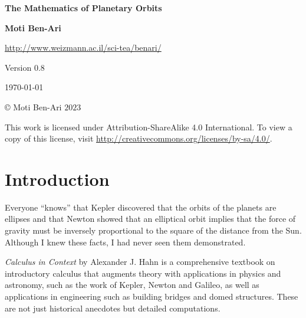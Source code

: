 

\thispagestyle{empty}

\begin{center}
\textbf{\LARGE The Mathematics of Planetary Orbits}

\bigskip
\bigskip
\bigskip

\textbf{\Large Moti Ben-Ari}

\bigskip

\url{http://www.weizmann.ac.il/sci-tea/benari/}

\bigskip
\bigskip
\bigskip

Version $0.8$

\bigskip

\today

\end{center}

\vfill

\begin{center}
\copyright{} Moti Ben-Ari $2023$
\end{center}
 
\begin{small}
This work is licensed under Attribution-ShareAlike 4.0 International. To view a copy of this license, visit \url{http://creativecommons.org/licenses/by-sa/4.0/}.
\end{small}

\newpage

\tableofcontents

\newpage

\section{Introduction}

Everyone ``knows'' that Kepler discovered that the orbits of the planets are ellipses and that Newton showed that an elliptical orbit implies that the force of gravity must be inversely proportional to the square of the distance from the Sun. Although I knew these facts, I had never seen them demonstrated.

\textit{Calculus in Context} \cite{hahn-cic} by Alexander J. Hahn is a comprehensive textbook on introductory calculus that augments theory with  applications in physics and astronomy, such as the work of Kepler, Newton and Galileo, as well as applications in engineering such as building bridges and domed structures. These are not just historical anecdotes but detailed computations.

